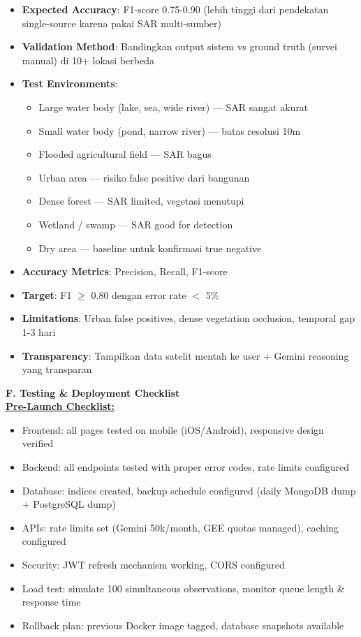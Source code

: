 \documentclass[12pt,a4paper]{article}
\newcommand{\subsectionbox}[1]{%
  \textbf{\large #1}\\[0.3cm]
}
\begin{document}
\begin{itemize}
  \item \textbf{Expected Accuracy}: F1-score 0.75-0.90 (lebih tinggi dari pendekatan single-source karena pakai SAR multi-sumber)
  \item \textbf{Validation Method}: Bandingkan output sistem vs ground truth (survei manual) di 10+ lokasi berbeda
  \item \textbf{Test Environments}:
    \begin{itemize}
      \item Large water body (lake, sea, wide river) — SAR sangat akurat
      \item Small water body (pond, narrow river) — batas resolusi 10m
      \item Flooded agricultural field — SAR bagus
      \item Urban area — risiko false positive dari bangunan
      \item Dense forest — SAR limited, vegetasi menutupi
      \item Wetland / swamp — SAR good for detection
      \item Dry area — baseline untuk konfirmasi true negative
    \end{itemize}
  \item \textbf{Accuracy Metrics}: Precision, Recall, F1-score
  \item \textbf{Target}: F1 $\ge$ 0.80 dengan error rate $<$ 5\%
  \item \textbf{Limitations}: Urban false positives, dense vegetation occlusion, temporal gap 1-3 hari
  \item \textbf{Transparency}: Tampilkan data satelit mentah ke user + Gemini reasoning yang transparan
\end{itemize}

\vspace{0.5cm}

\subsectionbox{F. Testing \& Deployment Checklist}

\textbf{\underline{Pre-Launch Checklist:}}
\begin{itemize}
  \item Frontend: all pages tested on mobile (iOS/Android), responsive design verified
  \item Backend: all endpoints tested with proper error codes, rate limits configured
  \item Database: indices created, backup schedule configured (daily MongoDB dump + PostgreSQL dump)
  \item APIs: rate limits set (Gemini 50k/month, GEE quotas managed), caching configured
  \item Security: JWT refresh mechanism working, CORS configured
  \item Load test: simulate 100 simultaneous observations, monitor queue length \& response time
  \item Rollback plan: previous Docker image tagged, database snapshots available
\end{itemize}
\end{document}
